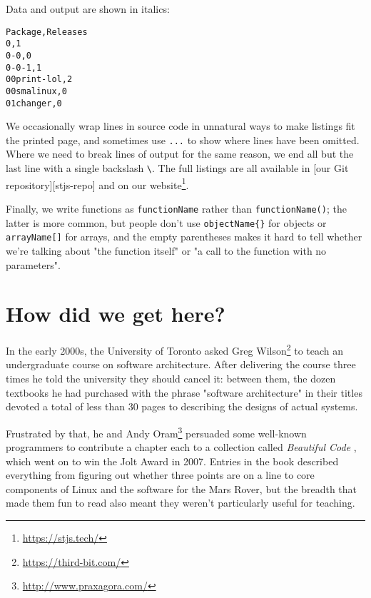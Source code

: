 \documentclass[krantzl]{krantz}
\newcommand{\hreffoot}[2]{{#1}\footnote{\href{#2}{#2}}}
\begin{document}
\noindent Data and output are shown in italics:

\begin{lstlisting}[frame=single,frameround=tttt]
Package,Releases
0,1
0-0,0
0-0-1,1
00print-lol,2
00smalinux,0
01changer,0
\end{lstlisting}


We occasionally wrap lines in source code in unnatural ways to make listings fit the printed page,
and sometimes use \texttt{...} to show where lines have been omitted.
Where we need to break lines of output for the same reason,
we end all but the last line with a single backslash \texttt{{\textbackslash}}.
The full listings are all available in [our Git repository][stjs-repo]
and \hreffoot{on our website}{https://stjs.tech/}.


Finally,
we write functions as \texttt{functionName} rather than \texttt{functionName()};
the latter is more common,
but people don't use \texttt{objectName\{\}} for objects or \texttt{arrayName[]} for arrays,
and the empty parentheses makes it hard to tell
whether we're talking about "the function itself" or "a call to the function with no parameters".

\section{How did we get here?}\label{introduction-history}


In the early 2000s,
the University of Toronto asked \hreffoot{Greg Wilson}{https://third-bit.com/}
to teach an undergraduate course on software architecture.
After delivering the course three times he told the university they should cancel it:
between them,
the dozen textbooks he had purchased with the phrase "software architecture" in their titles
devoted a total of less than 30 pages to describing the designs of actual systems.


\newpage


Frustrated by that,
he and \hreffoot{Andy Oram}{http://www.praxagora.com/} persuaded some well-known programmers to contribute a chapter each
to a collection called \emph{Beautiful Code} \cite{Oram2007},
which went on to win the Jolt Award in 2007.
Entries in the book described everything from figuring out whether three points are on a line
to core components of Linux
and the software for the Mars Rover,
but the breadth that made them fun to read
also meant they weren't particularly useful for teaching.
\end{document}
